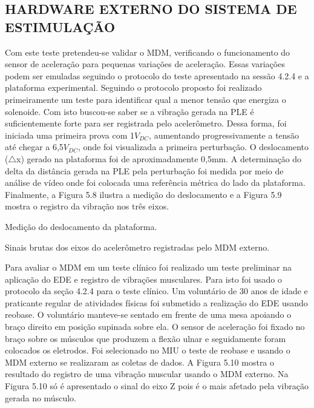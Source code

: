 \subsection{HARDWARE  EXTERNO  DO  SISTEMA  DE  ESTIMULAÇÃO}
Com  este  teste  pretendeu-se  validar  o  \acrshort{MDM},  verificando  o  funcionamento  do  sensor  de  aceleração  para  pequenas  variações  de  aceleração.  Essas  variações  podem  ser  emuladas  seguindo  o  protocolo  do  teste  apresentado  na  sessão  4.2.4  e  a  plataforma  experimental.      Seguindo  o  protocolo  proposto  foi  realizado  primeiramente  um  teste  para  identificar  qual  a  menor  tensão  que  energiza  o  solenoide.  Com  isto  buscou-se  saber  se  a  vibração  gerada  na  PLE  é  suficientemente  forte  para  ser  registrada  pelo  acelerômetro.  Dessa  forma,  foi  iniciada  uma  primeira  prova  com  1$V_{DC}$,  aumentando  progressivamente  a  tensão  até  chegar  a  6,5$V_{DC}$,  onde  foi  visualizada  a  primeira  perturbação.  O  deslocamento  ($\mathbf{\bigtriangleup}$x)  gerado  na  plataforma  foi  de  aproximadamente  0,5mm.  A  determinação  do  delta  da  distância  gerada  na  PLE  pela  perturbação  foi  medida  por  meio  de  análise  de  vídeo  onde  foi  colocada  uma  referência  métrica  do  lado  da  plataforma.  Finalmente,  a  Figura  5.8  ilustra  a  medição  do  deslocamento  e  a  Figura  5.9  mostra  o  registro  da  vibração  nos  três  eixos. 

  Medição  do  deslocamento  da  plataforma. 
  
    Sinais  brutas  dos  eixos  do  acelerômetro  registradas  pelo  \acrshort{MDM}  externo.
  
  Para  avaliar  o  \acrshort{MDM}  em  um  teste  clínico  foi  realizado  um  teste  preliminar  na  aplicação  do  \acrshort{EDE}  e  registro  de  vibrações  musculares.  Para  isto  foi  usado  o  protocolo  da  seção  4.2.4  para  o  teste  clínico.  Um  voluntário  de  30  anos  de  idade  e  praticante  regular  de  atividades  físicas  foi  submetido  a  realização  do  \acrshort{EDE}  usando  reobase.  O  voluntário  manteve-se  sentado  em  frente  de  uma  mesa  apoiando  o  braço  direito  em  posição  supinada  sobre  ela.  O  sensor  de  aceleração  foi  fixado  no  braço  sobre  os  músculos  que  produzem  a  flexão  ulnar  e  seguidamente  foram  colocados  os  eletrodos.  Foi  selecionado  no  \acrshort{MIU}  o  teste  de  reobase  e  usando  o  \acrshort{MDM}  externo  se  realizaram  as  coletas  de  dados.  A  Figura  5.10  mostra  o  resultado  do  registro  de  uma  vibração  muscular  usando  o  \acrshort{MDM}  externo.  Na  Figura  5.10  só  é  apresentado  o  sinal  do  eixo  Z  pois  é  o  mais  afetado  pela  vibração  gerada  no  músculo.   
  
